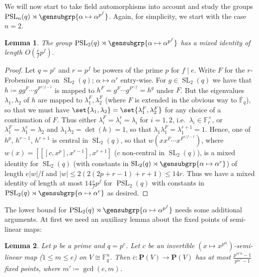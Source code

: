 \documentclass[a4paper,11pt]{amsproc}
\newcommand{\norm}[1]{\lvert#1\rvert}%
\newcommand{\finfield}{\mathbb{F}}%
\DeclareMathOperator{\SL}{SL}%
\DeclareMathOperator{\PSL}{PSL}%
\newcommand{\proj}{\mathbf P}%
\theoremstyle{plain}
\newtheorem{lemma}{Lemma}[section]
\theoremstyle{definition}
\begin{document}
	We will now start to take field automorphisms into account and study the groups $\PSL_n(q)\rtimes\gensubgrp{\alpha\mapsto\alpha^{p^f}}$. Again, for simplicity, we start with the case $n=2.$
	
	\begin{lemma}
		The group $\PSL_2(q)\rtimes\gensubgrp{\alpha\mapsto\alpha^{p^f}}$ has a mixed identity of length $O(\frac{e}{f}p^f).$
	\end{lemma}
	
	\begin{proof}
		Let $q=p^e$ and $r=p^f$ be powers of the prime $p$ for $f\mid e$. Write $F$ for the $r$-Frobenius map on $\SL_2(q)$; $\alpha\mapsto\alpha^r$ entry-wise. For $g\in\SL_2(q)$ we have that $h\coloneqq gg^F\cdots g^{F^{e/f-1}}$ is mapped to $h^F=g^F\cdots g^{F^{e/f}}=h^g$ under $F$. But the eigenvalues $\lambda_1,\lambda_2$ of $h$ are mapped to $\lambda_1^F,\lambda_2^F$ (where $F$ is extended in the obvious way to $\overline{\finfield}_q$), so that we must have $\set{\lambda_1,\lambda_2}=\set{\lambda_1^F,\lambda_2^F}$ for any choice of a continuation of $F$. Thus either $\lambda_i^F=\lambda_i^r=\lambda_i$ for $i=1,2$, i.e.\ $\lambda_i\in\finfield_r^\times$, or $\lambda_1^F=\lambda_1^r=\lambda_2$ and $\lambda_1\lambda_2=\det(h)=1$, so that $\lambda_1\lambda_1^F=\lambda_1^{r+1}=1$. Hence, one of $h^p$, $h^{r-1}$, $h^{r+1}$ is central in $\SL_2(q)$, so that $w(x x^F\cdots x^{F^{e/f-1}})$, where $w(x)=[[[c,x^p],x^{r-1}],x^{r+1}]$ ($c$ non-central in $\SL_2(q)$), is a mixed identity for $\SL_2(q)$ (with constants in $\SL_2(q)\rtimes\gensubgrp{\alpha\mapsto\alpha^r}$) of length $e\norm{w}$/f and $\norm{w}\leq2(2(2p+r-1)+r+1)\leq 14r$. Thus we have a mixed identity of length at most $14\frac{e}{f}p^f$ for $\PSL_2(q)$ with constants in $\PSL_2(q)\rtimes\gensubgrp{\alpha\mapsto\alpha^r}$ as desired.
	\end{proof}
	
	The lower bound for $\PSL_2(q)\rtimes\gensubgrp{\alpha\mapsto\alpha^{p^f}}$ needs some additional arguments. At first we need an auxiliary lemma about the fixed points of semi-linear maps:
	
	\begin{lemma}\label{lem:fxd_pts_semilin_map}
		Let $p$ be a prime and $q=p^e$. Let $c$ be an invertible $(x\mapsto x^{p^m})$-semi-linear map ($1\leq m\leq e$) on $V\cong\finfield_q^n$. Then $\overline{c}\colon\proj(V)\to\proj(V)$ has at most $\frac{p^{m' n}-1}{p^{m'}-1}$ fixed points, where $m'\coloneqq\gcd(e,m)$.
	\end{lemma}
	
\end{document}
